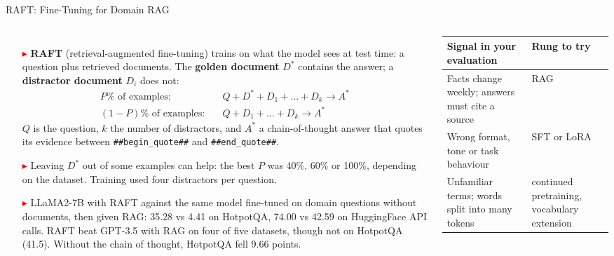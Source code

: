 \begin{frame}{RAFT: Fine-Tuning for Domain RAG}
  \begin{columns}[T,onlytextwidth]
      \begin{itemize}\scriptsize\itemsep0.3em
        \item[\textcolor{red}{$\blacktriangleright$}] \textbf{RAFT} (retrieval-augmented fine-tuning) trains on what the model sees at test time: a question plus retrieved documents. The \textbf{golden document} $D^{*}$ contains the answer; a \textbf{distractor document} $D_i$ does not:
          \[ \begin{aligned} P\%\text{ of examples:}&\quad Q + D^{*} + D_1 + \dots + D_k \rightarrow A^{*}\\ (1-P)\%\text{ of examples:}&\quad Q + D_1 + \dots + D_k \rightarrow A^{*} \end{aligned} \]
          $Q$ is the question, $k$ the number of distractors, and $A^{*}$ a chain-of-thought answer that quotes its evidence between \texttt{\#\#begin\_quote\#\#} and \texttt{\#\#end\_quote\#\#}.
        \item[\textcolor{red}{$\blacktriangleright$}] Leaving $D^{*}$ out of some examples can help: the best $P$ was 40\%, 60\% or 100\%, depending on the dataset. Training used four distractors per question.
        \item[\textcolor{red}{$\blacktriangleright$}] LLaMA2-7B with RAFT against the same model fine-tuned on domain questions without documents, then given RAG: 35.28 vs 4.41 on HotpotQA, 74.00 vs 42.59 on HuggingFace API calls. RAFT beat GPT-3.5 with RAG on four of five datasets, though not on HotpotQA (41.5). Without the chain of thought, HotpotQA fell 9.66 points.
      \end{itemize}
      \centering
      {\scriptsize
      \begin{tabular}{>{\raggedright\arraybackslash}p{3.0cm} >{\raggedright\arraybackslash}p{2.1cm}}
        \toprule
        \textbf{Signal in your evaluation} & \textbf{Rung to try} \\
        \midrule
        Facts change weekly; answers must cite a source & RAG \\
        \addlinespace[0.15em]
        Wrong format, tone or task behaviour & SFT or LoRA \\
        \addlinespace[0.15em]
        Unfamiliar terms; words split into many tokens & continued pretraining, vocabulary extension \\

\end{tabular}}
\end{columns}
\end{frame}
